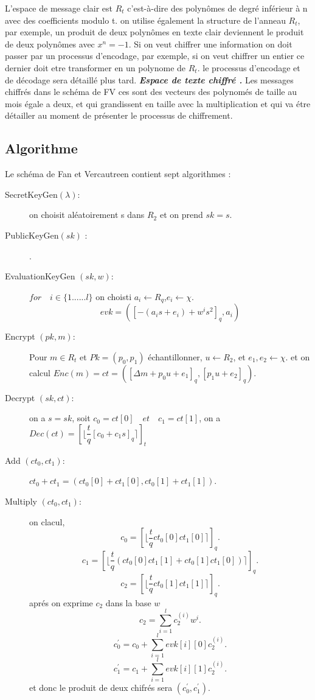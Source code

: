 \documentclass[a4paper,11pt]{report}
\begin{document}
L'espace de message clair est $R_t$ c'est-à-dire des polynômes de degré inférieur à n avec des coefficients modulo t. on utilise également la structure de l'anneau $R_t$, par exemple, un produit de deux polynômes en texte clair deviennent le produit de deux polynômes avec $x^n = -1$.\newline
Si on veut chiffrer une information on doit passer par un processus d'encodage, par exemple, si on veut chiffrer un entier ce dernier doit etre transformer en un polynome de $R_t$. le processus d'encodage et de décodage sera détaillé plus tard.\newline 
\textbf{\textit{ Espace de texte chiffré .}}\newline
Les messages chiffrés dans le schéma de FV ces sont des vecteurs  des polynomés de taille au mois égale a deux, et qui grandissent en taille avec la multiplication et qui va étre détailler au moment de présenter le processus de chiffrement. 
\subsection*{Algorithme}
Le schéma de Fan et Vercautreen contient sept algorithmes : \newline
 \begin{description}
 \item[SecretKeyGen$(\lambda)$:]  on choisit aléatoirement s dans $R_2$ et on prend $sk=s$.
 \item[PublicKeyGen$(sk)$ :] .
 \item[EvaluationKeyGen $(sk, w)$:] $for\quad i\in \{1......l\}$ on choisti $a_i\xleftarrow{}{}R_q$,$e_i\xleftarrow{}{}\chi.$\newline
 $$evk = ([-(a_is+e_i)+w^is^2]_q, a_i)$$
 \item[Encrypt $(pk, m)$:] Pour $m \in R_t$ et $Pk = (p_0, p_1)$ échantillonner, $u\xleftarrow{}{} {R_2}$, et $e_1,e_2 \xleftarrow{}{} \chi$.
 \newline et on calcul $Enc(m) = ct = ([\Delta m + p_0 u + e_1]_q, [p_1 u + e_2]_q).$
 \item[Decrypt $(sk, ct)$:] on a $s = sk $, soit $c_0 = ct[0]\quad et\quad c_1 = ct[1]$, on a $Dec(ct) = [\lfloor\dfrac{t}{q}[c_0 + c_1 s]_q\rceil]_t$
 \item[Add  $(ct_0, ct_1)$:]  $ct_0 + ct_1 = (ct_0[0] + ct_1[0], ct_0[1] + ct_1[1])$.
 \item[Multiply $(ct_0, ct_1)$:] on clacul, \newline
 $$c_0 = [\lfloor\dfrac{t}{q}ct_0[0]ct_1[0]\rceil]_q.$$
 $$c_1 = [\lfloor\dfrac{t}{q}(ct_0[0]ct_1[1] + ct_0[1]ct_1[0])\rceil]_q.$$
 $$c_2 = [\lfloor\dfrac{t}{q}ct_0[1]ct_1[1]\rceil]_q .$$ 
 aprés on exprime $c_2 $ dans la base $w$ $$c_2 = \sum_{i=1}^{l}c_2^{(i)}w^i.$$
 $$c_0^{'} = c_0 + \sum_{i=1}^{l}evk[i][0]c_2^{(i)} .$$
 $$c_1^{'} = c_1 + \sum_{i=1}^{l}evk[i][1]c_2^{(i)} .$$
 et donc le produit de deux chifrés sera $(c_0^{'}, c_1^{'}).$
  \end{description}
\end{document}
